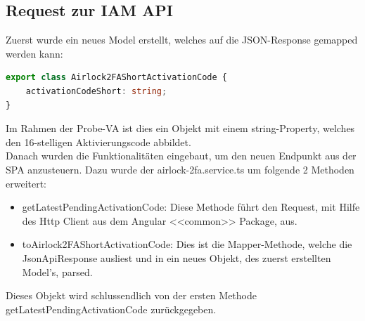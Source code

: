 \subsection{Request zur IAM API}
Zuerst wurde ein neues Model erstellt, welches auf die JSON-Response gemapped werden kann:
\begin{lstlisting}[language=TypeScript]
export class Airlock2FAShortActivationCode {
	activationCodeShort: string;
}
\end{lstlisting}
Im Rahmen der Probe-VA ist dies ein Objekt mit einem string-Property, welches den 16-stelligen Aktivierungscode abbildet. \\
Danach wurden die Funktionalitäten eingebaut, um den neuen Endpunkt aus der SPA anzusteuern. Dazu wurde der \flqq airlock-2fa.service.ts\frqq{} um folgende 2 Methoden erweitert:
\begin{itemize}
	\item getLatestPendingActivationCode: Diese Methode führt den Request, mit Hilfe des Http Client aus dem Angular <<common>> Package, aus. 
	\item toAirlock2FAShortActivationCode: Dies ist die Mapper-Methode, welche die JsonApiResponse ausliest und in ein neues Objekt, des zuerst erstellten Model's, parsed. 
\end{itemize}
Dieses Objekt wird schlussendlich von der ersten Methode \flqq getLatestPendingActivationCode\frqq{} zurückgegeben.


